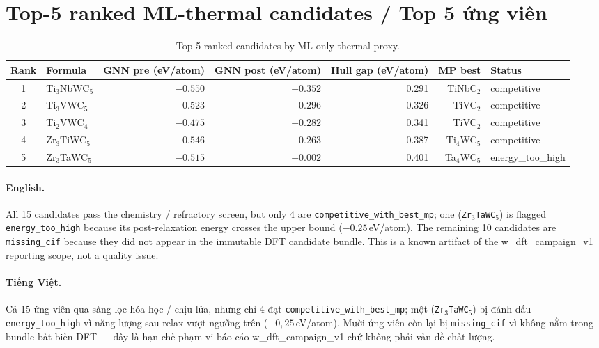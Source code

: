 \documentclass[11pt,a4paper]{report}
\newcommand{\eV}{eV/atom}
\begin{document}
\section{Top-5 ranked ML-thermal candidates / Top 5 ứng viên}

\begin{table}[h]
\centering
\caption{Top-5 ranked candidates by ML-only thermal proxy.}
\label{tab:top5}
\begin{tabular}{clrrrrl}
\toprule
\textbf{Rank} & \textbf{Formula} & \textbf{GNN pre (\eV)} & \textbf{GNN post (\eV)} & \textbf{Hull gap (\eV)} & \textbf{MP best} & \textbf{Status} \\
\midrule
1 & Ti$_3$NbWC$_5$  & $-0.550$ & $-0.352$ & 0.291 & TiNbC$_2$  & competitive \\
2 & Ti$_3$VWC$_5$   & $-0.523$ & $-0.296$ & 0.326 & TiVC$_2$   & competitive \\
3 & Ti$_2$VWC$_4$   & $-0.475$ & $-0.282$ & 0.341 & TiVC$_2$   & competitive \\
4 & Zr$_3$TiWC$_5$  & $-0.546$ & $-0.263$ & 0.387 & Ti$_4$WC$_5$ & competitive \\
5 & Zr$_3$TaWC$_5$  & $-0.515$ & $+0.002$ & 0.401 & Ta$_4$WC$_5$ & energy\_too\_high \\
\bottomrule
\end{tabular}
\end{table}

\paragraph{English.}
All 15 candidates pass the chemistry / refractory screen, but only 4 are
\texttt{competitive\_with\_best\_mp}; one (\texttt{Zr$_3$TaWC$_5$}) is flagged
\texttt{energy\_too\_high} because its post-relaxation energy crosses the upper bound
($-0.25$\,\eV{}). The remaining 10 candidates are \texttt{missing\_cif} because they did
not appear in the immutable DFT candidate bundle. This is a known artifact of the
w\_dft\_campaign\_v1 reporting scope, not a quality issue.

\paragraph{Tiếng Việt.}
Cả 15 ứng viên qua sàng lọc hóa học / chịu lửa, nhưng chỉ 4 đạt \texttt{competitive\_with\_best\_mp};
một (\texttt{Zr$_3$TaWC$_5$}) bị đánh dấu \texttt{energy\_too\_high} vì năng lượng sau relax vượt
ngưỡng trên ($-0{,}25$\,\eV{}). Mười ứng viên còn lại bị \texttt{missing\_cif} vì không nằm
trong bundle bất biến DFT — đây là hạn chế phạm vi báo cáo w\_dft\_campaign\_v1 chứ không
phải vấn đề chất lượng.
\end{document}
